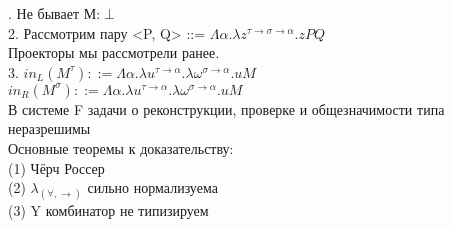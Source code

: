 \documentclass[10pt,a4paper]{article}
\begin{document}
	. Не бывает М:$\perp$\\
	2. Рассмотрим пару <P, Q> ::= $\Lambda\alpha.\lambda z^{\tau\rightarrow\sigma\rightarrow\alpha}.z P Q$ \\
	Проекторы мы рассмотрели ранее. \\
	3. $in_L(M^{\tau}) ::= \Lambda\alpha.\lambda u^{\tau\rightarrow\alpha}.\lambda\omega^{\sigma\rightarrow\alpha}.u M$\\
	$ in_R(M^{\sigma}) ::= \Lambda\alpha.\lambda u^{\tau\rightarrow\alpha}.\lambda\omega^{\sigma\rightarrow\alpha}.u M$\\
	
	В системе F задачи о реконструкции, проверке и общезначимости типа неразрешимы\\
	
	Основные теоремы к доказательству: \\
	(1) Чёрч Россер\\
	(2) $\lambda_{(\forall, \rightarrow)}$ сильно нормализуема \\
	(3) Y комбинатор не типизируем
   
\end{document}
